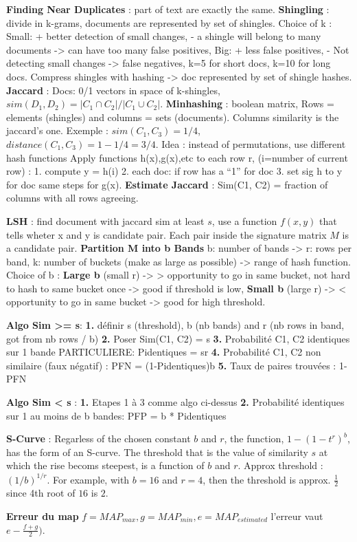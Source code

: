 \documentclass[9pt,a4paper]{report}
\begin{document}
\textbf{Finding Near Duplicates} : part of text are exactly the same. \textbf{Shingling} : divide in k-grams, documents are represented by set of shingles. Choice of k : Small: + better detection of small changes, - a shingle will belong to many documents -> can have too many false positives, Big: + less false positives, - Not detecting small changes -> false negatives, k=5 for short docs, k=10 for long docs. Compress shingles with hashing -> doc represented by set of shingle hashes. \textbf{Jaccard} : Docs: 0/1 vectors in space of k-shingles, $sim(D_1,D_2)=|C_1 \cap C_2|/|C_1\cup C_2|$. \textbf{Minhashing} : boolean matrix, Rows = elements (shingles) and columns = sets (documents). Columns similarity is the jaccard's one. Exemple : $sim(C_1,C_3)=1/4$, $distance(C_1,C_3)=1-1/4=3/4$. Idea : instead of permutations, use different hash functions Apply functions h(x),g(x),etc to each row r, (i=number of current row) : 1. compute y = h(i) 2. each doc: if row has a “1” for doc 3. set sig h to y for doc
same steps for g(x). \textbf{Estimate Jaccard} : Sim(C1, C2) = fraction of columns with all rows agreeing.

\textbf{LSH} : find document with jaccard sim at least $s$, use a function $f(x,y)$ that tells wheter x and y is candidate pair. Each pair inside the signature matrix $M$ is a candidate pair. \textbf{Partition M into b Bands} b: number of bands -> r: rows per band, k: number of buckets (make as large as possible) -> range of hash function. Choice of b : \textbf{Large b} (small r) -> > opportunity to go in same bucket, not hard to hash to same bucket once -> good if threshold is low, \textbf{Small b} (large r) -> < opportunity to go in same bucket -> good for high threshold.

\textbf{Algo Sim >= s}: \textbf{1.} définir s (threshold), b (nb bands) and r (nb rows in band, got from nb rows / b)
\textbf{2.} Poser Sim(C1, C2) = s
\textbf{3.} Probabilité C1, C2 identiques sur 1 bande PARTICULIERE: Pidentiques = sr
\textbf{4.} Probabilité C1, C2 non similaire (faux négatif) : PFN = (1-Pidentiques)b
\textbf{5.} Taux de paires trouvées : 1-PFN

\textbf{Algo Sim < s} :
\textbf{1.} Etapes 1 à 3 comme algo ci-dessus
\textbf{2.} Probabilité identiques sur 1 au moins de b bandes: PFP = b *  Pidentiques

\textbf{S-Curve} : Regarless of the chosen constant $b$ and $r$, the function, $1-(1-t^r)^b$, has the form of an S-curve. The threshold that is the value of similarity $s$ at which the rise becoms steepest, is a function of $b$ and $r$. Approx threshold : $(1/b)^{1/r}$. For example, with $b=16$ and $r=4$, then the threshold is approx. $\frac{1}{2}$ since 4th root of $16$ is $2$.

\textbf{Erreur du map} $f = MAP_{max}, g = MAP_{min}, e=MAP_{estimated}$ l'erreur vaut $e-\frac{f+g}{2})$.
\end{document}
